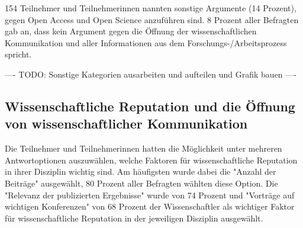 154 Teilnehmer und Teilnehmerinnen nannten sonstige Argumente (14 Prozent), gegen Open Access und Open Science anzuführen sind. 8 Prozent aller Befragten gab an, dass kein Argument gegen die Öffnung der wissenschaftlichen Kommunikation und aller Informationen aus dem Forschungs-/Arbeitsprozess spricht.

---- TODO: Sonstige Kategorien ausarbeiten und aufteilen und Grafik bauen ----

\subsection{Wissenschaftliche Reputation und die Öffnung von wissenschaftlicher Kommunikation}

Die Teilnehmer und Teilnehmerinnen hatten die Möglichkeit unter mehreren Antwortoptionen auszuwählen, welche Faktoren für wissenschaftliche Reputation in ihrer Disziplin wichtig sind. Am häufigsten wurde dabei die "Anzahl der Beiträge" ausgewählt, 80 Prozent aller Befragten wählten diese Option. Die "Relevanz der publizierten Ergebnisse" wurde von 74 Prozent und "Vorträge auf wichtigen Konferenzen" von 68 Prozent der Wissenschaftler als wichtiger Faktor für wissenschaftliche Reputation in der jeweiligen Disziplin ausgewählt.

